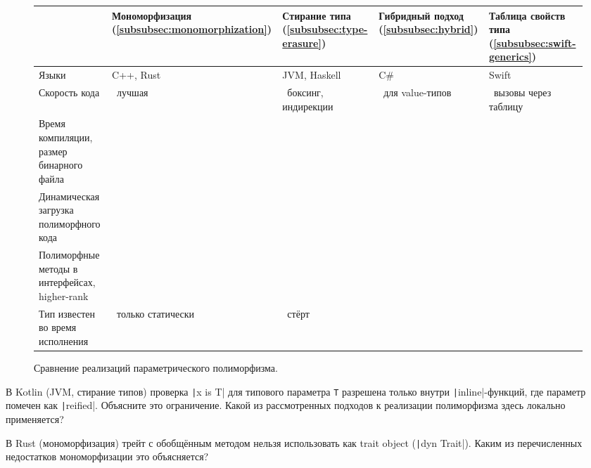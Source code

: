 \begin{figure}[!ht]
    \centering
    \small
    \renewcommand{\arraystretch}{1.3}
    \newcommand{\yes}{\leavevmode\positive}
    \newcommand{\no}{\leavevmode\negative}
    \begin{tabularx}{\textwidth}{|>{\raggedright\arraybackslash}p{}|>{\raggedright\arraybackslash}X|>{\raggedright\arraybackslash}X|>{\raggedright\arraybackslash}X|>{\raggedright\arraybackslash}X|}
        \hline
        & Мономор\-физация (\ref{subsubsec:monomorphization}) & Стирание типа (\ref{subsubsec:type-erasure}) & Гибридный подход (\ref{subsubsec:hybrid}) & Таблица свойств типа (\ref{subsubsec:swift-generics}) \\
        \hline
        Языки & C++, Rust & JVM, Haskell & C\# & Swift \\
        \hline
        Скорость кода & \yes~лучшая & \no~боксинг, индирекции & \yes~для value-типов & \no~вызовы через таблицу \\
        \hline
        Время компиляции, размер бинарного файла & \no & \yes & \yes & \yes \\
        \hline
        Динамическая загрузка полиморфного кода & \no & \yes & \yes & \yes \\
        \hline
        Полиморфные методы в интерфейсах, higher-rank & \no & \yes & \yes & \yes \\
        \hline
        Тип известен во время исполнения & \no~только статически & \no~стёрт & \yes & \yes \\
        \hline
    \end{tabularx}
    \caption{Сравнение реализаций параметрического полиморфизма.}
    \label{fig:poly-impl-comparison}
\end{figure}

\begin{task}
    В Kotlin (JVM, стирание типов) проверка \texttt|x is T| для типового параметра \texttt{T} разрешена только внутри \texttt|inline|-функций, где параметр помечен как \texttt|reified|.
    Объясните это ограничение.
    Какой из рассмотренных подходов к реализации полиморфизма здесь локально применяется?
\end{task}

\begin{task}
    В Rust (мономорфизация) трейт с обобщённым методом нельзя использовать как trait object (\texttt|dyn Trait|).
    Каким из перечисленных недостатков мономорфизации это объясняется?
\end{task}

